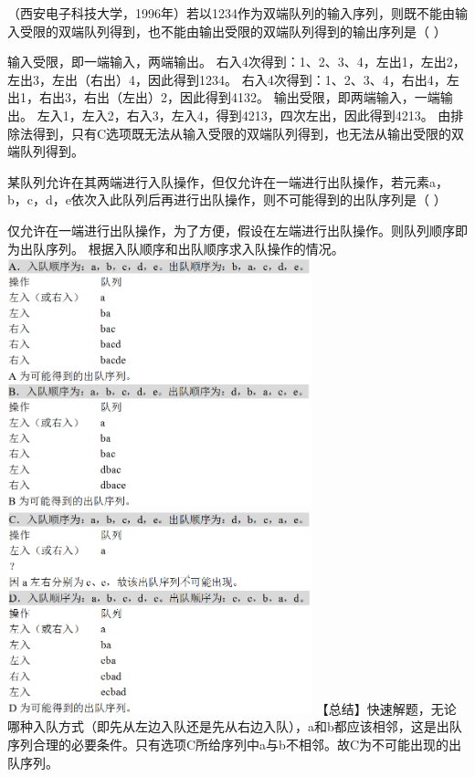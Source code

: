 \question （西安电子科技大学，1996年）若以1234作为双端队列的输入序列，则既不能由输入受限的双端队列得到，也不能由输出受限的双端队列得到的输出序列是（
）
\par{}
\begin{solution}输入受限，即一端输入，两端输出。
右入4次得到：1、2、3、4，左出1，左出2，左出3，左出（右出）4，因此得到1234。
右入4次得到：1、2、3、4，右出4，左出1，右出3，右出（左出）2，因此得到4132。
输出受限，即两端输入，一端输出。
左入1，左入2，右入3，左入4，得到4213，四次左出，因此得到4213。
由排除法得到，只有C选项既无法从输入受限的双端队列得到，也无法从输出受限的双端队列得到。
\end{solution}
\question 某队列允许在其两端进行入队操作，但仅允许在一端进行出队操作，若元素a，b，c，d，e依次入此队列后再进行出队操作，则不可能得到的出队序列是（
）
\par{}
\begin{solution}仅允许在一端进行出队操作，为了方便，假设在左端进行出队操作。则队列顺序即为出队序列。
根据入队顺序和出队顺序求入队操作的情况。\includegraphics[width=3.46875in,height=2.84375in]{computerassets/E077C7E626914B317B104E76339250DD.png}
\includegraphics[width=3.46875in,height=2.31250in]{computerassets/B94FE2E65B14D5127E7618D80587CA88.png}
【总结】快速解题，无论哪种入队方式（即先从左边入队还是先从右边入队），a和b都应该相邻，这是出队序列合理的必要条件。只有选项C所给序列中a与b不相邻。故C为不可能出现的出队序列。
\end{solution}
